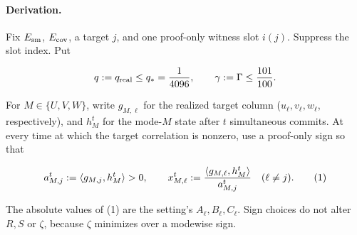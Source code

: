 \paragraph{Derivation.}

Fix \(E_{\rm sm}\), \(E_{\rm cov}\), a target \(j\), and one proof-only witness
slot \(i(j)\). Suppress the slot index. Put

\[
q:=q_{\rm real}\le q_*={1\over4096},\qquad
\gamma:=\Gamma\le {101\over100}.
\]

For \(M\in\{U,V,W\}\), write \(g_{M,\ell}\) for the realized target column
(\(u_\ell,v_\ell,w_\ell\), respectively), and \(h_M^t\) for the mode-\(M\)
state after \(t\) simultaneous commits. At every time at which the target
correlation is nonzero, use a proof-only sign so that

\[
a_{M,j}^t:=\langle g_{M,j},h_M^t\rangle>0,\qquad
x_{M,\ell}^t:={\langle g_{M,\ell},h_M^t\rangle\over a_{M,j}^t}
\quad(\ell\ne j).
\tag{1}
\]

The absolute values of (1) are the setting's \(A_\ell,B_\ell,C_\ell\).
Sign choices do not alter \(R,S\) or \(\zeta\), because \(\zeta\) minimizes
over a modewise sign.


